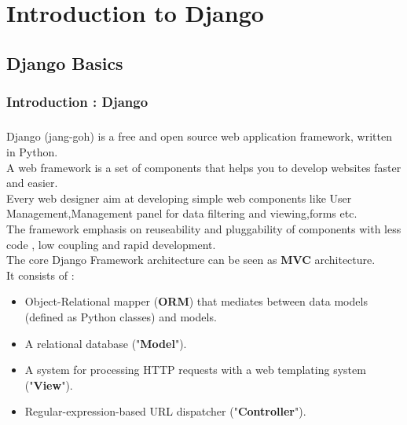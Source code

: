 \chapter{Introduction to Django}
\section{Django Basics}
\subsection{Introduction : Django}
\paragraph{} Django (jang-goh) is a free and open source web application framework, written in Python.\\ A web framework is
a set of components that helps you to develop websites faster and easier. \\ Every web designer aim at developing simple web components like User Management,Management panel for data filtering and viewing,forms etc.\\
The framework emphasis on reuseability and pluggability of components with less code , low coupling and rapid development.\\
The core Django Framework architecture can be seen as \textbf{MVC} architecture.\\
It consists of : 
\begin{itemize}
 \item Object-Relational mapper (\textbf{ORM}) that mediates between data models (defined as Python classes) and models.
 \item A relational database ("\textbf{Model}"). 
 \item A system for processing HTTP requests with a web templating system ("\textbf{View}").
 \item Regular-expression-based URL dispatcher ("\textbf{Controller}").
\end{itemize}
\newpage
